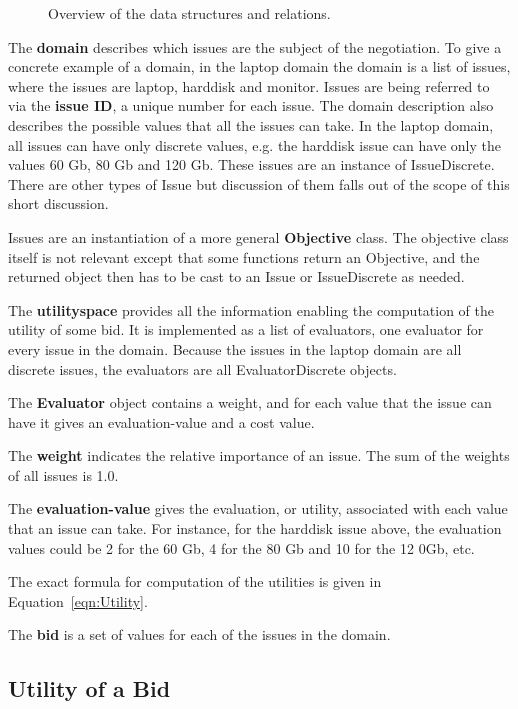 \documentclass[]{article}
\begin{document}
\begin{figure}
\caption{Overview of the data structures and relations.}\label{Fig:data structure and relation overview}
\end{figure}

The {\bf domain} describes which issues are the subject of the negotiation. To give a concrete example of a domain, in the laptop domain the domain is a list of issues, where the issues are laptop, harddisk and monitor. Issues are being referred to via the {\bf issue ID},  a unique number for each issue. The domain description also describes the possible values that all the issues can take. In the laptop domain, all issues can have only discrete values, e.g. the harddisk issue can have only the values 60 Gb, 80 Gb and 120 Gb. These issues are an instance of IssueDiscrete. There are other types of Issue but discussion of them falls out of the scope of this short discussion.

Issues are an instantiation of a more general {\bf Objective} class. The objective class itself is not relevant except that some functions return an Objective, and the returned object then has to be cast to an Issue or IssueDiscrete as needed.

The {\bf utilityspace} provides all the information enabling the computation of the utility of some bid. It is implemented as a list of evaluators, one evaluator for every issue in the domain. Because the issues in the laptop domain are all discrete issues, the evaluators are all EvaluatorDiscrete objects.

The {\bf Evaluator} object contains a weight, and for each value that the issue can have it gives an evaluation-value and a cost value.

The {\bf weight} indicates the relative importance of an issue. The sum of the weights of all issues is 1.0.

The {\bf evaluation-value} gives the evaluation, or utility, associated with each value that an issue can take. For instance, for the harddisk issue above, the evaluation values could be 2 for the 60 Gb, 4 for the 80 Gb and 10 for the 12 0Gb, etc.

The exact formula for computation of the utilities is given in Equation~\ref{eqn:Utility}.

The {\bf bid} is a set of values for each of the issues in the domain.

\subsection{Utility of a Bid}
\end{document}
